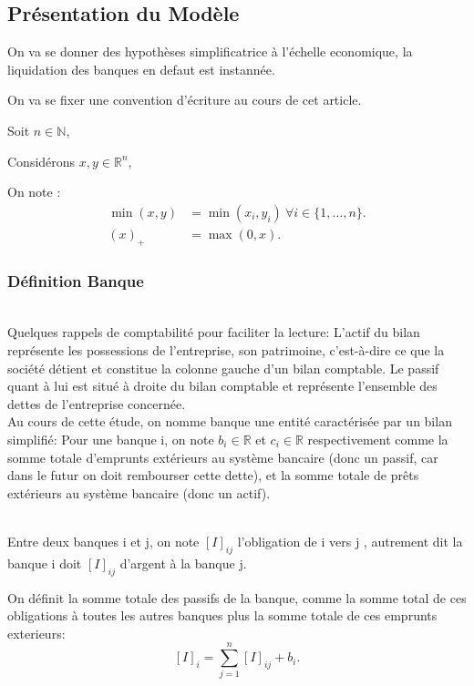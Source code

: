 \subsection{Présentation du Modèle}\label{subsec:presentation-du-modele}
On va se donner des hypothèses simplificatrice à l'échelle economique, la liquidation des banques en defaut est instannée.

On va se fixer une convention d'écriture au cours de cet article.

Soit $n \in \mathbb{N}$,

Considérons $x, y \in \mathbb{R}^n$,

On note :
\begin{align*}
    \min(x,y) &= \min(x_i, y_i) \ \forall i \in \{1,\ldots, n\}.\\
    (x)_{+}  &= \max(0, x).
\end{align*}
\subsubsection*{Définition Banque}
\\
Quelques rappels de comptabilité pour faciliter la lecture:
L'actif du bilan représente les possessions de l'entreprise,
son patrimoine, c'est-à-dire ce que la société détient et constitue la
colonne gauche d'un bilan comptable.
Le passif quant à lui est situé à
droite du bilan comptable et représente l'ensemble des dettes de
l'entreprise concernée.
\\
Au cours de cette étude, on nomme banque une entité caractérisée par un bilan simplifié:
Pour une banque i, on note $b_i \in \mathbb{R}$ et $c_i \in \mathbb{R}$ respectivement comme la somme totale d'emprunts extérieurs au système bancaire (donc un passif, car dans le
futur on doit rembourser cette dette), et la somme totale de prêts extérieurs au système bancaire (donc un actif).

\\
Entre deux banques i et j, on note $[I]_{ij}$ l'obligation de i vers j , autrement dit la banque i doit $[I]_{ij}$ d'argent
à la banque j.

On définit la somme totale des passifs de la banque, comme la somme total de ces obligations à toutes les autres banques
plus la somme totale de ces emprunts exterieurs:
$$[I]_{i} = \sum_{j=1}^{n} [I]_{ij} + b_i.$$

